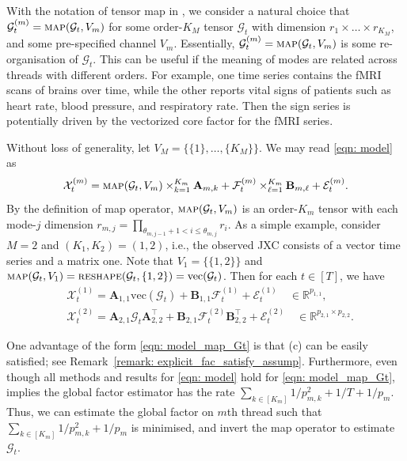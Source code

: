 \documentclass[aos]{imsart}
\theoremstyle{plain}
\theoremstyle{definition}
\def\map{\textnormal{\textsc{map}}}
\def\reshape{\textnormal{\textsc{reshape}}}
\def\R{\mathbb{R}}
\def\cE{\mathcal{E}}
\def\cF{\mathcal{F}}
\def\cG{\mathcal{G}} \def\cH{\boldsymbol{\mathcal{H}}} \def\cI{\mathcal{I}}
\def\cX{\mathcal{X}}
\def\bA{\mathbf{A}}
\def\bB{\mathbf{B}}
\def\trans{\intercal}
\def\vec{\mathrm{vec}}
\begin{document}
With the notation of tensor map in , we consider a natural choice that $\cG_t^{(m)} = \map(\cG_t, V_m)$ for some order-$K_M$ tensor $\cG_t$ with dimension $r_1\times \dots\times r_{K_M}$, and some pre-specified channel $V_m$.
Essentially, $\cG_t^{(m)} = \map(\cG_t, V_m)$ is some re-organisation of $\cG_t$.
This can be useful if the meaning of modes are related across threads with different orders. For example, one time series contains the fMRI scans of brains over time, while the other reports vital signs of patients such as heart rate, blood pressure, and respiratory rate. Then the sign series is potentially driven by the vectorized core factor for the fMRI series.

Without loss of generality, let $V_M=\big\{\{1\}, \dots, \{K_M\} \big\}$. We may read \eqref{eqn: model} as
\begin{equation}
\label{eqn: model_map_Gt}
\cX_t^{(m)} = \map(\cG_t, V_m) \times_{k=1}^{K_m} \bA_{m,k} + \cF_t^{(m)} \times_{\ell=1}^{K_m} \bB_{m,\ell} + \cE_t^{(m)} .
\end{equation}
By the definition of map operator, $\map(\cG_t, V_m)$ is an order-$K_m$ tensor with each mode-$j$ dimension $r_{m,j} = \prod_{\theta_{m,j-1}+1 <i \leq \theta_{m,j}} r_i$. As a simple example, consider $M=2$ and $(K_1, K_2)=(1,2)$, i.e., the observed JXC consists of a vector time series and a matrix one. Note that $V_1 =\big\{ \{1,2\} \big\}$ and $\map(\cG_t, V_1)=\reshape(\cG_t, \{1,2\}) =\vec(\cG_t)$. Then for each $t\in[T]$, we have
\begin{align*}
    & \cX_t^{(1)} = \bA_{1,1} \vec(\cG_t) + \bB_{1,1} \cF_t^{(1)} + \cE_t^{(1)}
    \quad \in \R^{p_{1,1}} ,\\
    & \cX_t^{(2)} = \bA_{2,1} \cG_t \bA_{2,2}^\trans + \bB_{2,1} \cF_t^{(2)} \bB_{2,2}^\trans + \cE_t^{(2)} 
    \quad \in \R^{p_{2,1} \times p_{2,2}} .
\end{align*}

One advantage of the form \eqref{eqn: model_map_Gt} is that (c) can be easily satisfied; see Remark~\ref{remark: explicit_fac_satisfy_assump}.
Furthermore, even though all methods and results for \eqref{eqn: model} hold for \eqref{eqn: model_map_Gt},  implies the global factor estimator has the rate $\sum_{k\in[K_m]} 1/p_{m,k}^2 + 1/T + 1/p_m$. Thus, we can estimate the global factor on $m$th thread such that $\sum_{k\in[K_m]} 1/p_{m,k}^2 + 1/p_m$ is minimised, and invert the map operator to estimate $\cG_t$.
\end{document}
